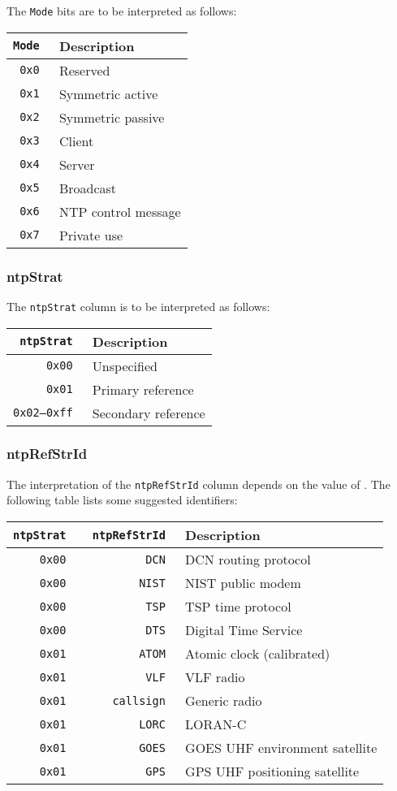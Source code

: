 \documentclass[documentation]{subfiles}
\begin{document}
The {\tt Mode} bits are to be interpreted as follows:
\begin{longtable}{>{\tt}rl}
    \toprule
    {\bf Mode} & {\bf Description}\\
    \midrule\endhead%
    0x0 & Reserved\\
    0x1 & Symmetric active\\
    0x2 & Symmetric passive\\
    0x3 & Client\\
    0x4 & Server\\
    0x5 & Broadcast\\
    0x6 & NTP control message\\
    0x7 & Private use\\
    \bottomrule
\end{longtable}

\subsubsection{ntpStrat}\label{ntpStrat}
The {\tt ntpStrat} column is to be interpreted as follows:
\begin{longtable}{>{\tt}rl}
    \toprule
    {\bf ntpStrat} & {\bf Description}\\
    \midrule\endhead%
    0x00       & Unspecified \\
    0x01       & Primary reference\\
    0x02--0xff & Secondary reference\\
    \bottomrule
\end{longtable}

\subsubsection{ntpRefStrId}\label{ntpRefStrId}
The interpretation of the {\tt ntpRefStrId} column depends on the value of .
The following table lists some suggested identifiers:
\begin{longtable}{>{\tt}r>{\tt}rl}
    \toprule
    {\bf ntpStrat} & {\bf ntpRefStrId} & {\bf Description}\\
    \midrule\endhead%
    0x00 & DCN      & DCN routing protocol\\
    0x00 & NIST     & NIST public modem\\
    0x00 & TSP      & TSP time protocol\\
    0x00 & DTS      & Digital Time Service\\
    0x01 & ATOM     & Atomic clock (calibrated)\\
    0x01 & VLF      & VLF radio\\
    0x01 & callsign & Generic radio\\
    0x01 & LORC     & LORAN-C\\
    0x01 & GOES     & GOES UHF environment satellite\\
    0x01 & GPS      & GPS UHF positioning satellite\\
    \bottomrule
\end{longtable}
\end{document}
